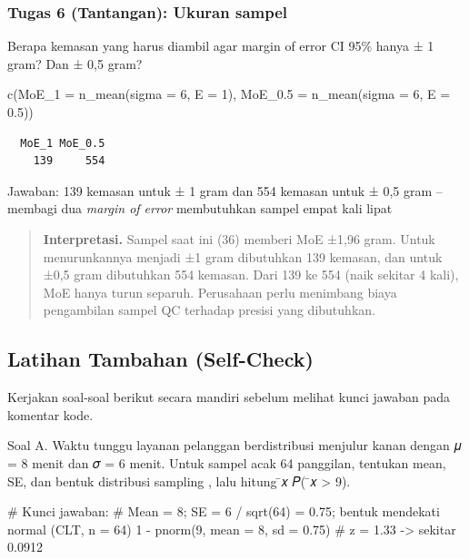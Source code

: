 \documentclass[
  indonesian,
  letterpaper,
]{book}
\newenvironment{Shaded}{\begin{snugshade}}{\end{snugshade}}
\newcommand{\AttributeTok}[1]{\textcolor[rgb]{0.40,0.45,0.13}{#1}}
\newcommand{\CommentTok}[1]{\textcolor[rgb]{0.37,0.37,0.37}{#1}}
\newcommand{\DecValTok}[1]{\textcolor[rgb]{0.68,0.00,0.00}{#1}}
\newcommand{\FloatTok}[1]{\textcolor[rgb]{0.68,0.00,0.00}{#1}}
\newcommand{\FunctionTok}[1]{\textcolor[rgb]{0.28,0.35,0.67}{#1}}
\newcommand{\NormalTok}[1]{\textcolor[rgb]{0.00,0.23,0.31}{#1}}
\newcommand{\SpecialCharTok}[1]{\textcolor[rgb]{0.37,0.37,0.37}{#1}}
\begin{document}
\subsubsection{Tugas 6 (Tantangan): Ukuran
sampel}\label{tugas-6-tantangan-ukuran-sampel}

Berapa kemasan yang harus diambil agar margin of error CI 95\% hanya ± 1
gram? Dan ± 0,5 gram?

\begin{Shaded}
\begin{Highlighting}[]
\FunctionTok{c}\NormalTok{(}\AttributeTok{MoE\_1 =} \FunctionTok{n\_mean}\NormalTok{(}\AttributeTok{sigma =} \DecValTok{6}\NormalTok{, }\AttributeTok{E =} \DecValTok{1}\NormalTok{), }\AttributeTok{MoE\_0.5 =} \FunctionTok{n\_mean}\NormalTok{(}\AttributeTok{sigma =} \DecValTok{6}\NormalTok{, }\AttributeTok{E =} \FloatTok{0.5}\NormalTok{))}
\end{Highlighting}
\end{Shaded}

\begin{verbatim}
  MoE_1 MoE_0.5 
    139     554 
\end{verbatim}

Jawaban: 139 kemasan untuk ± 1 gram dan 554 kemasan untuk ± 0,5 gram --
membagi dua \emph{margin of error} membutuhkan sampel empat kali lipat

\begin{quote}
\textbf{Interpretasi.} Sampel saat ini (36) memberi MoE ±1,96 gram.
Untuk menurunkannya menjadi ±1 gram dibutuhkan 139 kemasan, dan untuk
±0,5 gram dibutuhkan 554 kemasan. Dari 139 ke 554 (naik sekitar 4 kali),
MoE hanya turun separuh. Perusahaan perlu menimbang biaya pengambilan
sampel QC terhadap presisi yang dibutuhkan.
\end{quote}

\subsection{Latihan Tambahan
(Self-Check)}\label{latihan-tambahan-self-check}

Kerjakan soal-soal berikut secara mandiri sebelum melihat kunci jawaban
pada komentar kode.

Soal A. Waktu tunggu layanan pelanggan berdistribusi menjulur kanan
dengan 𝜇 = 8 menit dan 𝜎 = 6 menit. Untuk sampel acak 64 panggilan,
tentukan mean, SE, dan bentuk distribusi sampling , lalu hitung ̄𝑥 𝑃( ̄𝑥
\textgreater{} 9).

\begin{Shaded}
\begin{Highlighting}[]
\CommentTok{\# Kunci jawaban:}
\CommentTok{\# Mean = 8; SE = 6 / sqrt(64) = 0.75; bentuk mendekati normal (CLT, n = 64)}
\DecValTok{1} \SpecialCharTok{{-}} \FunctionTok{pnorm}\NormalTok{(}\DecValTok{9}\NormalTok{, }\AttributeTok{mean =} \DecValTok{8}\NormalTok{, }\AttributeTok{sd =} \FloatTok{0.75}\NormalTok{) }\CommentTok{\# z = 1.33 {-}\textgreater{} sekitar 0.0912}
\end{Highlighting}
\end{Shaded}
\end{document}
